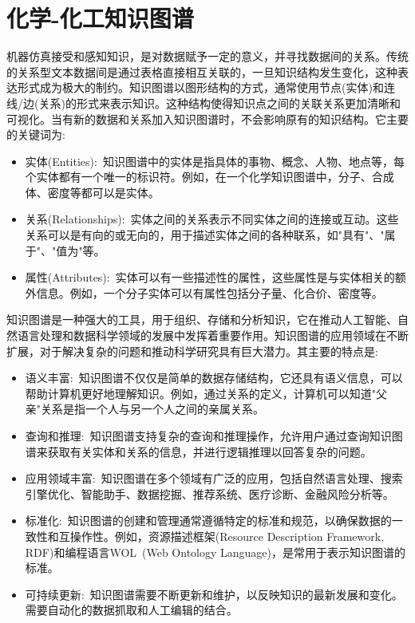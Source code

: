 \section{化学-化工知识图谱}
机器仿真接受和感知知识，是对数据赋予一定的意义，并寻找数据间的关系。传统的关系型文本数据间是通过表格直接相互关联的，一旦知识结构发生变化，这种表达形式成为极大的制约。知识图谱以图形结构的方式，通常使用节点(实体)和连线/边(关系)的形式来表示知识。这种结构使得知识点之间的关联关系更加清晰和可视化。当有新的数据和关系加入知识图谱时，不会影响原有的知识结构。它主要的关键词为:
\begin{itemize}
	\item 实体\textrm{(Entities)}:~知识图谱中的实体是指具体的事物、概念、人物、地点等，每个实体都有一个唯一的标识符。例如，在一个化学知识图谱中，分子、合成体、密度等都可以是实体。
	\item 关系\textrm{(Relationships)}:~实体之间的关系表示不同实体之间的连接或互动。这些关系可以是有向的或无向的，用于描述实体之间的各种联系，如"具有"、"属于"、"值为"等。
	\item 属性\textrm{(Attributes)}:~实体可以有一些描述性的属性，这些属性是与实体相关的额外信息。例如，一个分子实体可以有属性包括分子量、化合价、密度等。
\end{itemize}

知识图谱是一种强大的工具，用于组织、存储和分析知识，它在推动人工智能、自然语言处理和数据科学领域的发展中发挥着重要作用。知识图谱的应用领域在不断扩展，对于解决复杂的问题和推动科学研究具有巨大潜力。其主要的特点是:
\begin{itemize}
	\item 语义丰富:~知识图谱不仅仅是简单的数据存储结构，它还具有语义信息，可以帮助计算机更好地理解知识。例如，通过关系的定义，计算机可以知道"父亲"关系是指一个人与另一个人之间的亲属关系。
	\item 查询和推理:~知识图谱支持复杂的查询和推理操作，允许用户通过查询知识图谱来获取有关实体和关系的信息，并进行逻辑推理以回答复杂的问题。
	\item 应用领域丰富:~知识图谱在多个领域有广泛的应用，包括自然语言处理、搜索引擎优化、智能助手、数据挖掘、推荐系统、医疗诊断、金融风险分析等。
	\item 标准化:~知识图谱的创建和管理通常遵循特定的标准和规范，以确保数据的一致性和互操作性。例如，资源描述框架\textrm{(Resource Description Framework, RDF)}和编程语言\textrm{WOL~(Web Ontology Language)}，是常用于表示知识图谱的标准。
	\item 可持续更新:~知识图谱需要不断更新和维护，以反映知识的最新发展和变化。需要自动化的数据抓取和人工编辑的结合。
\end{itemize}

